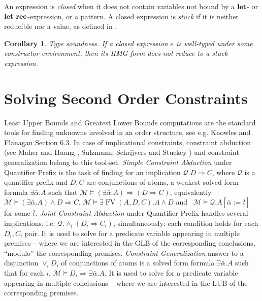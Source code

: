 \documentclass{article}
\newcommand{\assign}{:=}
\newcommand{\tmem}[1]{{\em #1\/}}
\newcommand{\tmop}[1]{\ensuremath{\operatorname{#1}}}
\newcommand{\tmstrong}[1]{\textbf{#1}}
\newtheorem{corollary}{Corollary}
\begin{document}
An expression is {\tmem{closed}} when it does not contain variables not bound
by a $\text{{\tmstrong{let}}}$- or $\text{{\tmstrong{let rec}}}$-expression,
or a pattern. A closed expression is {\tmem{stuck}} if it is neither reducible
nor a value, as defined in {\cite{simonet-pottier-hmg-toplas}}.

\begin{corollary}
  \label{TypeSoundness}{\tmem{Type soundness}}. If a closed expression $e$ is
  well-typed under some constructor environment, then its HMG-form does not
  reduce to a stuck expression.
\end{corollary}

\chapter{Solving Second Order Constraints}\label{ChapSolv}

Least Upper Bounds and Greatest Lower Bounds computations are the standard
tools for finding unknowns involved in an order structure, see e.g. Knowles
and Flanagan {\cite{KnowlesF07}} Section 6.3. In case of implicational
constraints, constraint abduction (see Maher and Huang
{\cite{AbductionSolvMaher}}, Sulzmann, Schrijvers and Stuckey
{\cite{AbdEADTs}}) and constraint generalization belong to this tool-set.
{\tmem{Simple Constraint Abduction}} under Quantifier Prefix is the task of
finding for an implication $\mathcal{Q}.D \Rightarrow C$, where $\mathcal{Q}$
is a quantifier prefix and $D, C$ are conjunctions of atoms, a weakest solved
form formula $\exists \bar{\alpha} .A$ such that $\mathcal{M} \vDash (\exists
\bar{\alpha} .A) \Rightarrow (D \Rightarrow C)$, equivalently $\mathcal{M}
\vDash (\exists \bar{\alpha} .A) \wedge D \Rightarrow C$, $\mathcal{M} \vDash
\exists \tmop{FV} (A, D, C) .A \wedge D$ and \ $\mathcal{M} \vDash
\mathcal{Q}.A [\bar{\alpha} \assign \bar{t}]$ for some $\bar{t}$. {\tmem{Joint
Constraint Abduction}} under Quantifier Prefix handles several implications,
i.e. $\mathcal{Q}. \wedge_i (D_i \Rightarrow C_i)$, simultaneously: each
condition holds for each $D_i, C_i$ pair. It is used to solve for a predicate
variable appearing in multiple premises -- where we are interested in the GLB
of the corresponding conclusions, ``modulo'' the corresponding premises.
{\tmem{Constraint Generalization}} answer to a disjunction $\vee_i D_i$ of
conjunctions of atoms is a solved form formula $\exists \bar{\alpha} .A$ such
that for each $i$, $\mathcal{M} \vDash D_i \Rightarrow \exists \bar{\alpha}
.A$. It is used to solve for a predicate variable appearing in multiple
conclusions -- where we are interested in the LUB of the corresponding
premises.
\end{document}
